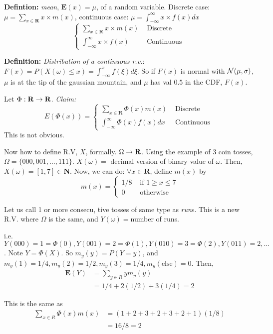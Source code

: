 \begin{enumerate}
\textbf{Defintion:} \emph{mean}, $\mathbf{E}(x)=\mu$,  of a random variable. Discrete case:
$\mu = \sum_{x\in \mathbf{R}}x\times m(x)$, continuous case:
$\mu = \int_{-\infty}^{\infty}x\times f(x)dx$
$$
\begin{cases}
  \sum_{x\in \mathbf{R}} x\times m(x) & \text{ Discrete }\\
  \int_{-\infty}^\infty x\times f(x) & \text{ Continuous } 
\end{cases}
$$

\textbf{Definition:} \emph{Distribution of a continuous r.v.}: $F(x) =
P(X(\omega) \le x) = \int_{-\infty}^xf(\xi)d\xi$. So if $F(x)$ is
normal with $\mathcal{N}(\mu, \sigma)$, $\mu$ is at the tip of the
gaussian mountain, and $\mu$ has val $0.5$ in the CDF, $F(x)$.


Let $\Phi: \mathbf{R} \rarr \mathbf{R}$. \emph{Claim:} 
$$E(\Phi(x)) =
\begin{cases}
  \sum_{x\in \mathbf{R}} \Phi(x)m(x) & \text{ Discrete }\\
  \int_{-\infty}^\infty \Phi(x)f(x)dx & \text{ Continuous }  
 
\end{cases}
$$
This is not obvious.

Now how to define R.V, $X$, formally. $\Omega \rightarrow \textbf{R}$. Using
the example of 3 coin tosses, $\Omega =
\{000,001,\dots,111\}$. $X(\omega) =$ decimal version of binary value
of $\omega$. Then, $X(\omega)= [1, 7] \in \textbf{N}$. Now, we can do:
$\forall x\in \textbf{R}$, define $m(x)$ by $$
m(x)=
\begin{cases}
1/8 & \text{ if } 1\ge x\le 7 \\
0 & \text{ otherwise}
\end{cases}
$$

Let us call 1 or more consecu, tive tosses of same type as \emph{run}s. This is a
new R.V. where $\Omega$ is the same, and $Y(\omega) = $number of
runs.

i.e. $Y(000) = 1 = \Phi(0), Y(001) =2=\Phi(1), Y(010)=3=\Phi(2),
Y(011)=2, \dots$. Note $Y=\Phi(X)$. So $m_y(y) = P(Y=y)$, and $m_y(1)
= 1/4, m_y(2)=1/2, m_y(3)=1/4, m_y(\text{else}) =0$. Then,
\begin{align*}
\mathbf{E}(Y) &= \sum_{y\in R}ym_y(y)\\
& = 1/4 + 2(1/2) + 3(1/4) = 2  
\end{align*}

This is the same as 
\begin{align*}
\sum_{x\in R}\Phi(x)m(x) &= (1+2+3+2+3+2+1)(1/8)\\
&=16/8=2
\end{align*}
\end{enumerate}
\pagebreak
